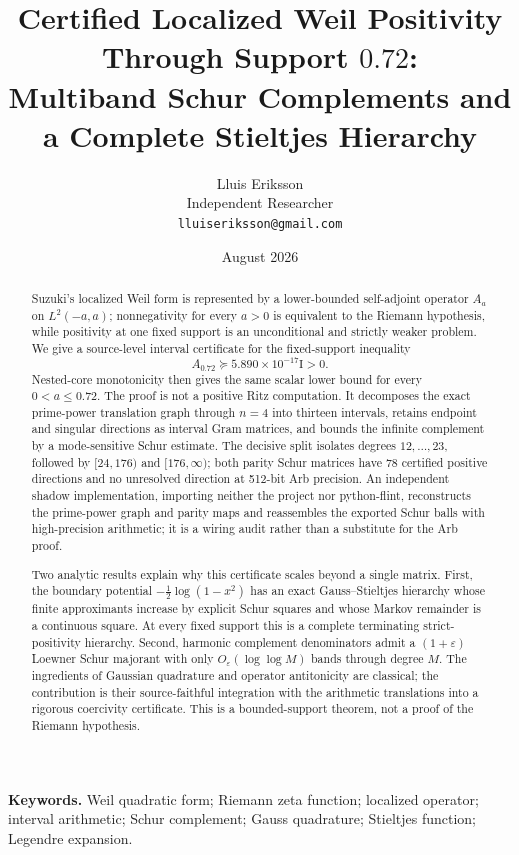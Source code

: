 \documentclass[10pt]{article}
\title{\bfseries Certified Localized Weil Positivity Through Support $0.72$:\\
Multiband Schur Complements and a Complete Stieltjes Hierarchy}
\author{Lluis Eriksson\\Independent Researcher\\\texttt{lluiseriksson@gmail.com}}
\date{August 2026}
\newcommand{\Id}{\mathrm I}
\begin{document}
\maketitle

\begin{abstract}
Suzuki's localized Weil form is represented by a lower-bounded self-adjoint
operator $A_a$ on $L^2(-a,a)$; nonnegativity for every $a>0$ is equivalent to the
Riemann hypothesis, while positivity at one fixed support is an unconditional
and strictly weaker problem.  We give a source-level interval certificate for
the fixed-support inequality
\[
 A_{0.72}\succeq 5.890\times10^{-17}\Id>0.
\]
Nested-core monotonicity then gives the same scalar lower bound for every
$0<a\le0.72$.  The proof is not a positive Ritz computation.  It decomposes
the exact prime-power translation graph through $n=4$ into thirteen intervals, retains
endpoint and singular directions as interval Gram matrices, and bounds the
infinite complement by a mode-sensitive Schur estimate.  The decisive split
isolates degrees $12,\ldots,23$, followed by $[24,176)$ and $[176,\infty)$;
both parity Schur matrices have
78 certified positive directions and no unresolved direction at 512-bit Arb
precision.
An independent shadow implementation, importing neither the project nor
python-flint, reconstructs the prime-power graph and parity maps and
reassembles the exported Schur balls with high-precision arithmetic; it is a
wiring audit rather than a substitute for the Arb proof.

Two analytic results explain why this certificate scales beyond a single
matrix.  First, the boundary potential
$-\tfrac12\log(1-x^2)$ has an exact Gauss--Stieltjes hierarchy whose finite
approximants increase by explicit Schur squares and whose Markov remainder is
a continuous square.  At every fixed support this is a complete terminating
strict-positivity hierarchy.  Second, harmonic complement denominators admit
a $(1+\varepsilon)$ Loewner Schur majorant with only
$O_\varepsilon(\log\log M)$ bands through degree $M$.  The ingredients of
Gaussian quadrature and operator antitonicity are classical; the contribution
is their source-faithful integration with the arithmetic translations into a
rigorous coercivity certificate.  This is a bounded-support theorem, not a
proof of the Riemann hypothesis.
\end{abstract}

\noindent\textbf{Keywords.} Weil quadratic form; Riemann zeta function;
localized operator; interval arithmetic; Schur complement; Gauss quadrature;
Stieltjes function; Legendre expansion.
\end{document}
